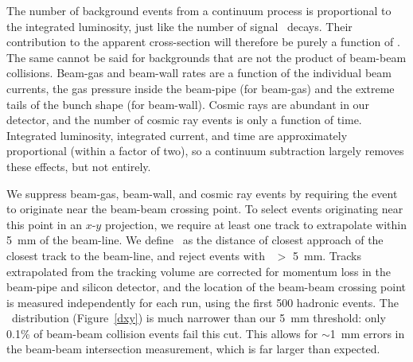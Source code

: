 \documentclass{cornell}
\begin{document}
The number of background events from a continuum process is
proportional to the integrated luminosity, just like the number of
signal \ups\ decays.  Their contribution to the apparent cross-section
will therefore be purely a function of \ecm.  The same cannot be said
for backgrounds that are not the product of beam-beam collisions.
Beam-gas and beam-wall rates are a function of the individual beam
currents, the gas pressure inside the beam-pipe (for beam-gas) and the
extreme tails of the bunch shape (for beam-wall).  Cosmic rays are
abundant in our detector, and the number of cosmic ray events is only
a function of time.  Integrated luminosity, integrated current, and
time are approximately proportional (within a factor of two), so a
continuum subtraction largely removes these effects, but not entirely.

We suppress beam-gas, beam-wall, and cosmic ray events by requiring
the event to originate near the beam-beam crossing point.  To select
events originating near this point in an $x$-$y$ projection, we
require at least one track to extrapolate within 5~mm of the beam-line.
We define \dxy\ as the distance of closest approach of the closest
track to the beam-line, and reject events with \dxy\ $>$ 5~mm.  Tracks
extrapolated from the tracking volume are corrected for momentum loss
in the beam-pipe and silicon detector, and the location of the
beam-beam crossing point is measured independently for each run, using
the first 500 hadronic events.  The \dxy\ distribution
(Figure~\ref{dxy}) is much narrower than our 5~mm threshold: only
0.1\% of beam-beam collision events fail this cut.  This allows for
$\sim$1~mm errors in the beam-beam intersection measurement, which is
far larger than expected.
\end{document}
